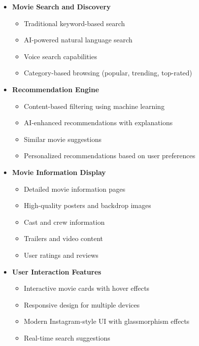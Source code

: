 \documentclass[12pt,a4paper]{article}
\begin{document}
\begin{itemize}
    \item \textbf{Movie Search and Discovery}
    \begin{itemize}
        \item Traditional keyword-based search
        \item AI-powered natural language search
        \item Voice search capabilities
        \item Category-based browsing (popular, trending, top-rated)
    \end{itemize}
    
    \item \textbf{Recommendation Engine}
    \begin{itemize}
        \item Content-based filtering using machine learning
        \item AI-enhanced recommendations with explanations
        \item Similar movie suggestions
        \item Personalized recommendations based on user preferences
    \end{itemize}
    
    \item \textbf{Movie Information Display}
    \begin{itemize}
        \item Detailed movie information pages
        \item High-quality posters and backdrop images
        \item Cast and crew information
        \item Trailers and video content
        \item User ratings and reviews
    \end{itemize}
    
    \item \textbf{User Interaction Features}
    \begin{itemize}
        \item Interactive movie cards with hover effects
        \item Responsive design for multiple devices
        \item Modern Instagram-style UI with glassmorphism effects
        \item Real-time search suggestions
    \end{itemize}
\end{itemize}
\end{document}
